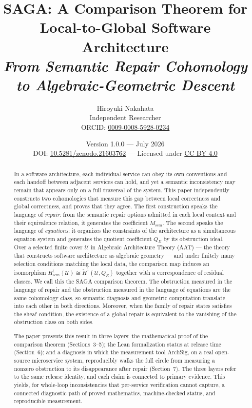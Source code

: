 \documentclass[11pt]{article}
\title{\textbf{SAGA: A Comparison Theorem for Local-to-Global Software Architecture}\\[0.6em]
\large\itshape From Semantic Repair Cohomology to Algebraic-Geometric Descent}
\author{Hiroyuki Nakahata\\
\normalsize Independent Researcher\\
\normalsize ORCID: \href{https://orcid.org/0009-0008-5928-0234}{0009-0008-5928-0234}}
\date{\normalsize Version 1.0.0 --- July 2026\\
\normalsize DOI: \href{https://doi.org/10.5281/zenodo.21603762}{10.5281/zenodo.21603762}
--- Licensed under \href{https://creativecommons.org/licenses/by/4.0/}{CC BY 4.0}}
\theoremstyle{plain}
\theoremstyle{definition}
\newcommand{\cU}{\mathcal{U}}
\newcommand{\Msem}{M_{\mathrm{sem}}}
\newcommand{\QE}{Q_{E}}
\begin{document}
\maketitle

\begin{abstract}
In a software architecture, each individual service can obey its own
conventions and each handoff between adjacent services can hold, and yet a
semantic inconsistency may remain that appears only on a full traversal
of the system. This paper independently constructs two cohomologies
that measure this gap between local correctness and global correctness, and
proves that they agree. The first construction speaks the language of
\emph{repair}: from the semantic repair options admitted in each local
context and their equivalence relation, it generates the coefficient
$\Msem$. The second speaks the language of \emph{equations}: it organizes
the constraints of the architecture as a simultaneous equation system and
generates the quotient coefficient $\QE$ by its obstruction ideal. Over a
selected finite cover $\cU$ in Algebraic Architecture Theory (AAT) --- the
theory that constructs software architecture as algebraic geometry --- and
under finitely many selection conditions matching the local data, the
comparison map induces an isomorphism
$H^1_{\mathrm{sem}}(\cU)\cong\check{H}^1(\cU,\QE)$ together with a
correspondence of residual classes. We call this the SAGA comparison
theorem. The obstruction measured in the language of repair and the
obstruction measured in the language of equations are the same cohomology
class, so semantic diagnosis and geometric computation translate into each
other in both directions. Moreover, when the family of repair states
satisfies the sheaf condition, the existence of a global repair is
equivalent to the vanishing of the obstruction class on both sides.

The paper presents this result in three layers: the mathematical proof of
the comparison theorem (Sections~3--5); the Lean formalization status at
release time (Section~6); and a diagnosis in which the measurement tool
ArchSig, on a real open-source microservice system, reproducibly walks the
full circle from measuring a nonzero obstruction to its disappearance after
repair (Section~7). The three layers refer to the same release identity,
and each claim is connected to primary evidence. This yields, for
whole-loop inconsistencies that per-service verification cannot capture, a
connected diagnostic path of proved mathematics, machine-checked status,
and reproducible measurement.
\end{abstract}
\end{document}
